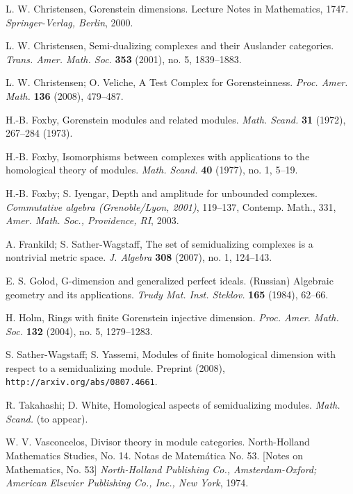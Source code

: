 \documentclass[a4, 10pt]{amsart}
\theoremstyle{plain}
\theoremstyle{definition}
\theoremstyle{remark}
\begin{document}
\begin{thebibliography}{99}

{\sc L. W. Christensen},
Gorenstein dimensions.
Lecture Notes in Mathematics, 1747.
{\em Springer-Verlag, Berlin}, 2000.

{\sc L. W. Christensen},
Semi-dualizing complexes and their Auslander categories.
{\em Trans. Amer. Math. Soc.} {\bf 353} (2001), no. 5, 1839--1883.

{\sc L. W. Christensen}; {\sc O. Veliche},
A Test Complex for Gorensteinness.
{\em Proc. Amer. Math.} {\bf 136} (2008), 479--487.

{\sc H.-B. Foxby},
Gorenstein modules and related modules.
{\em Math. Scand.} {\bf 31} (1972), 267--284 (1973).

{\sc H.-B. Foxby},
Isomorphisms between complexes with applications to the homological theory of modules.
{\em Math. Scand.} {\bf 40} (1977), no. 1, 5--19.

{\sc H.-B. Foxby}; {\sc S. Iyengar},
Depth and amplitude for unbounded complexes.
{\em Commutative algebra (Grenoble/Lyon, 2001)}, 119--137, Contemp. Math., 331, {\em Amer. Math. Soc., Providence, RI}, 2003.

{\sc A. Frankild}; {\sc S. Sather-Wagstaff},
The set of semidualizing complexes is a nontrivial metric space.
{\em J. Algebra} {\bf 308} (2007), no. 1, 124--143.

{\sc E. S. Golod},
G-dimension and generalized perfect ideals. (Russian)
Algebraic geometry and its applications. {\em Trudy Mat. Inst. Steklov.} {\bf 165} (1984), 62--66.

{\sc H. Holm},
Rings with finite Gorenstein injective dimension.
{\em Proc. Amer. Math. Soc.} {\bf 132} (2004), no. 5, 1279--1283.

{\sc S. Sather-Wagstaff}; {\sc S. Yassemi},
Modules of finite homological dimension with respect to a semidualizing module. Preprint (2008), \texttt{http://arxiv.org/abs/0807.4661}.

{\sc R. Takahashi}; {\sc D. White},
Homological aspects of semidualizing modules.
{\em Math. Scand.} (to appear).

{\sc W. V. Vasconcelos},
Divisor theory in module categories. North-Holland Mathematics Studies, No. 14. Notas de Matem\'{a}tica No. 53. [Notes on Mathematics, No. 53] {\em North-Holland Publishing Co., Amsterdam-Oxford; American Elsevier Publishing Co., Inc., New York}, 1974.

\end{thebibliography}
\end{document}
